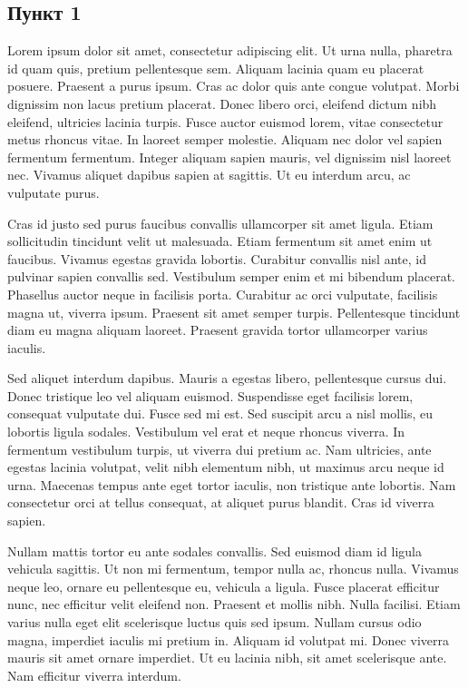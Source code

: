 \subsection{Пункт 1}
Lorem ipsum dolor sit amet, consectetur adipiscing elit. Ut urna nulla, pharetra id quam quis, pretium pellentesque sem. Aliquam lacinia quam eu placerat posuere. Praesent a purus ipsum. Cras ac dolor quis ante congue volutpat. Morbi dignissim non lacus pretium placerat. Donec libero orci, eleifend dictum nibh eleifend, ultricies lacinia turpis. Fusce auctor euismod lorem, vitae consectetur metus rhoncus vitae. In laoreet semper molestie. Aliquam nec dolor vel sapien fermentum fermentum. Integer aliquam sapien mauris, vel dignissim nisl laoreet nec. Vivamus aliquet dapibus sapien at sagittis. Ut eu interdum arcu, ac vulputate purus.
\par
Cras id justo sed purus faucibus convallis ullamcorper sit amet ligula. Etiam sollicitudin tincidunt velit ut malesuada. Etiam fermentum sit amet enim ut faucibus. Vivamus egestas gravida lobortis. Curabitur convallis nisl ante, id pulvinar sapien convallis sed. Vestibulum semper enim et mi bibendum placerat. Phasellus auctor neque in facilisis porta. Curabitur ac orci vulputate, facilisis magna ut, viverra ipsum. Praesent sit amet semper turpis. Pellentesque tincidunt diam eu magna aliquam laoreet. Praesent gravida tortor ullamcorper varius iaculis.
\par
Sed aliquet interdum dapibus. Mauris a egestas libero, pellentesque cursus dui. Donec tristique leo vel aliquam euismod. Suspendisse eget facilisis lorem, consequat vulputate dui. Fusce sed mi est. Sed suscipit arcu a nisl mollis, eu lobortis ligula sodales. Vestibulum vel erat et neque rhoncus viverra. In fermentum vestibulum turpis, ut viverra dui pretium ac. Nam ultricies, ante egestas lacinia volutpat, velit nibh elementum nibh, ut maximus arcu neque id urna. Maecenas tempus ante eget tortor iaculis, non tristique ante lobortis. Nam consectetur orci at tellus consequat, at aliquet purus blandit. Cras id viverra sapien.
\par
Nullam mattis tortor eu ante sodales convallis. Sed euismod diam id ligula vehicula sagittis. Ut non mi fermentum, tempor nulla ac, rhoncus nulla. Vivamus neque leo, ornare eu pellentesque eu, vehicula a ligula. Fusce placerat efficitur nunc, nec efficitur velit eleifend non. Praesent et mollis nibh. Nulla facilisi. Etiam varius nulla eget elit scelerisque luctus quis sed ipsum. Nullam cursus odio magna, imperdiet iaculis mi pretium in. Aliquam id volutpat mi. Donec viverra mauris sit amet ornare imperdiet. Ut eu lacinia nibh, sit amet scelerisque ante. Nam efficitur viverra interdum.
